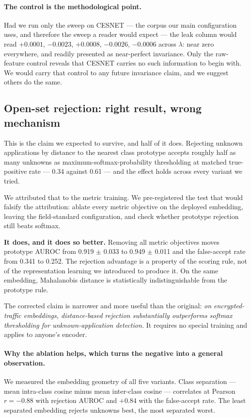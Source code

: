 \paragraph{The control is the methodological point.} Had we run only the sweep
on CESNET --- the corpus our main configuration uses, and therefore the sweep a
reader would expect --- the leak column would read $+0.0001$, $-0.0023$,
$+0.0008$, $-0.0026$, $-0.0006$ across $\lambda$: near zero everywhere, and
readily presented as near-perfect invariance. Only the raw-feature control
reveals that CESNET carries no such information to begin with. We would carry
that control to any future invariance claim, and we suggest others do the
same.

\subsection{Open-set rejection: right result, wrong mechanism}



This is the claim we expected to survive, and half of it does. Rejecting
unknown applications by distance to the nearest class prototype accepts roughly
half as many unknowns as maximum-softmax-probability thresholding at matched
true-positive rate --- 0.34 against 0.61 --- and the effect holds across every
variant we tried.

We attributed that to the metric training. We pre-registered the test that
would falsify the attribution: ablate every metric objective on the deployed
embedding, leaving the field-standard configuration, and check whether
prototype rejection still beats softmax.

\textbf{It does, and it does so better.} Removing all metric objectives moves
prototype AUROC from 0.919 $\pm$ 0.033 to 0.949 $\pm$ 0.011 and the false-accept
rate from 0.341 to 0.252. The rejection advantage is a property of the scoring
rule, not of the representation learning we introduced to produce it. On the
same embedding, Mahalanobis distance is statistically indistinguishable from
the prototype rule.

The corrected claim is narrower and more useful than the original: \emph{on
encrypted-traffic embeddings, distance-based rejection substantially outperforms
softmax thresholding for unknown-application detection.} It requires no special
training and applies to anyone's encoder.

\paragraph{Why the ablation helps, which turns the negative into a general
observation.} We measured the embedding geometry of all five variants. Class
separation --- mean intra-class cosine minus mean inter-class cosine ---
correlates at Pearson $r = -0.88$ with rejection AUROC and $+0.84$ with the
false-accept rate. The least separated embedding rejects unknowns best, the
most separated worst.

